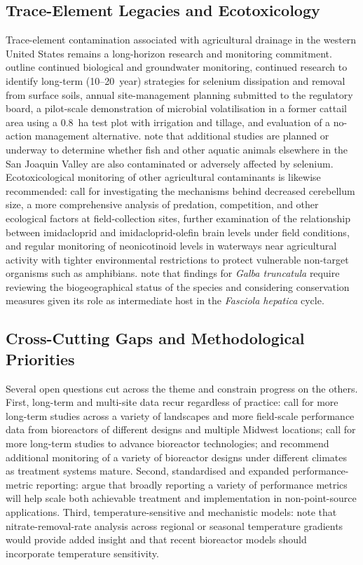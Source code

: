 \documentclass[11pt]{article}
\begin{document}
\subsection{Trace-Element Legacies and Ecotoxicology}
Trace-element contamination associated with agricultural drainage in the western United States remains a long-horizon research and monitoring commitment. \textcite{BENSON1993} outline continued biological and groundwater monitoring, continued research to identify long-term (10--20~year) strategies for selenium dissipation and removal from surface soils, annual site-management planning submitted to the regulatory board, a pilot-scale demonstration of microbial volatilisation in a former cattail area using a 0.8~ha test plot with irrigation and tillage, and evaluation of a no-action management alternative. \textcite{SAIKI1987} note that additional studies are planned or underway to determine whether fish and other aquatic animals elsewhere in the San Joaquin Valley are also contaminated or adversely affected by selenium. Ecotoxicological monitoring of other agricultural contaminants is likewise recommended: \textcite{Campbell2023} call for investigating the mechanisms behind decreased cerebellum size, a more comprehensive analysis of predation, competition, and other ecological factors at field-collection sites, further examination of the relationship between imidacloprid and imidacloprid-olefin brain levels under field conditions, and regular monitoring of neonicotinoid levels in waterways near agricultural activity with tighter environmental restrictions to protect vulnerable non-target organisms such as amphibians. \textcite{Dreyfuss2018} note that findings for \textit{Galba truncatula} require reviewing the biogeographical status of the species and considering conservation measures given its role as intermediate host in the \textit{Fasciola hepatica} cycle.

\subsection{Cross-Cutting Gaps and Methodological Priorities}
Several open questions cut across the theme and constrain progress on the others. First, long-term and multi-site data recur regardless of practice: \textcite{Bell2015} call for more long-term studies across a variety of landscapes and more field-scale performance data from bioreactors of different designs and multiple Midwest locations; \textcite{Christianson2021} call for more long-term studies to advance bioreactor technologies; and \textcite{Bailon2025} recommend additional monitoring of a variety of bioreactor designs under different climates as treatment systems mature. Second, standardised and expanded performance-metric reporting: \textcite{Maxwell2022} argue that broadly reporting a variety of performance metrics will help scale both achievable treatment and implementation in non-point-source applications. Third, temperature-sensitive and mechanistic models: \textcite{Christianson2021} note that nitrate-removal-rate analysis across regional or seasonal temperature gradients would provide added insight and that recent bioreactor models should incorporate temperature sensitivity.
\end{document}

